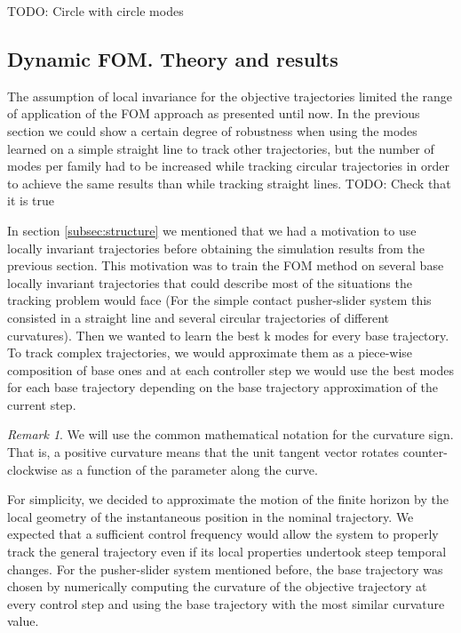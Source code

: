 \documentclass[12,twoside]{TFG-GM}
\theoremstyle{definition}
\theoremstyle{remark}
\newtheorem{remark}[theorem]{Remark}
\begin{document}
TODO: Circle with circle modes

\subsection{Dynamic FOM. Theory and results}
\label{subsec:dynfom}
The assumption of local invariance for the objective trajectories limited the range of application of the FOM approach as presented until now. In the previous section we could show a certain degree of robustness when using the modes learned on a simple straight line to track other trajectories, but the number of modes per family had to be increased while tracking circular trajectories in order to achieve the same results than while tracking straight lines. TODO: Check that it is true

In section \ref{subsec:structure} we mentioned that we had a motivation to use locally invariant trajectories before obtaining the simulation results from the previous section. This motivation was to train the FOM method on several base locally invariant trajectories that could describe most of the situations the tracking problem would face (For the simple contact pusher-slider system this consisted in a straight line and several circular trajectories of different curvatures). Then we wanted to learn the best k modes for every base trajectory. To track complex trajectories, we would approximate them as a piece-wise composition of base ones and at each controller step we would use the best modes for each base trajectory depending on the base trajectory approximation of the current step.

\begin{remark}
We will use the common mathematical notation for the curvature sign. That is, a positive curvature means that the unit tangent vector rotates counter-clockwise as a function of the parameter along the curve.
\end{remark}

For simplicity, we decided to approximate the motion of the finite horizon by the local geometry of the instantaneous position in the nominal trajectory. We expected that a sufficient control frequency would allow the system to properly track the general trajectory even if its local properties undertook steep temporal changes. For the pusher-slider system mentioned before, the base trajectory was chosen by numerically computing the curvature of the objective trajectory at every control step and using the base trajectory with the most similar curvature value.
\end{document}
